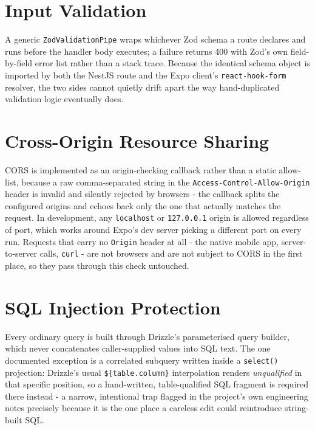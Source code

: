 \section{Input Validation}
\label{sec:validation-internals}
A generic \texttt{ZodValidationPipe} wraps whichever Zod schema a route declares and runs before the handler body executes; a failure returns 400 with Zod's own field-by-field error list rather than a stack trace. Because the identical schema object is imported by both the NestJS route and the Expo client's \texttt{react-hook-form} resolver, the two sides cannot quietly drift apart the way hand-duplicated validation logic eventually does.

\section{Cross-Origin Resource Sharing}
\label{sec:cors-internals}
CORS is implemented as an origin-checking callback rather than a static allow-list, because a raw comma-separated string in the \texttt{Access-Control-Allow-Origin} header is invalid and silently rejected by browsers - the callback splits the configured origins and echoes back only the one that actually matches the request. In development, any \texttt{localhost} or \texttt{127.0.0.1} origin is allowed regardless of port, which works around Expo's dev server picking a different port on every run. Requests that carry no \texttt{Origin} header at all - the native mobile app, server-to-server calls, \texttt{curl} - are not browsers and are not subject to CORS in the first place, so they pass through this check untouched.

\section{SQL Injection Protection}
\label{sec:sql-injection}
Every ordinary query is built through Drizzle's parameterised query builder, which never concatenates caller-supplied values into SQL text. The one documented exception is a correlated subquery written inside a \texttt{select()} projection: Drizzle's usual \texttt{\$\{table.column\}} interpolation renders \emph{unqualified} in that specific position, so a hand-written, table-qualified SQL fragment is required there instead - a narrow, intentional trap flagged in the project's own engineering notes precisely because it is the one place a careless edit could reintroduce string-built SQL.

